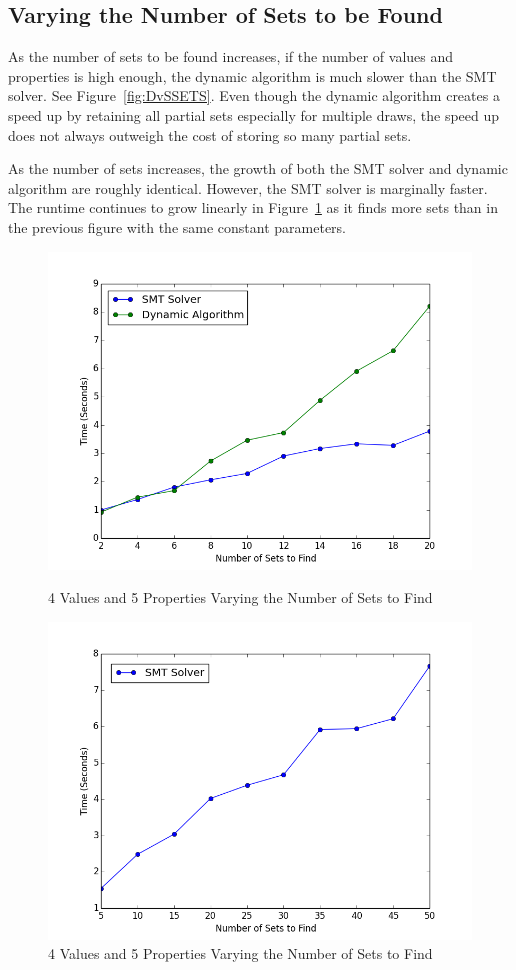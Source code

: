 \documentclass[pageno]{jpaper}
\begin{document}
\subsection{Varying the Number of Sets to be Found}

As the number of sets to be found increases, if the number of values and properties is high enough, the dynamic algorithm is much slower than  the SMT solver. See Figure~\ref{fig:DvSSETS}. Even though the dynamic algorithm creates a speed up by retaining all partial sets especially for multiple draws, the speed up does not always outweigh the cost of storing so many partial sets.

As the number of sets increases, the growth of both the SMT solver and dynamic algorithm are roughly identical. However, the SMT solver is marginally faster. The runtime continues to grow linearly in Figure~\ref{fig:SMTSet} as it finds more sets than in the previous figure with the same constant parameters.


\begin{figure}[htbb]
\begin{minipage}[b]{0.5\linewidth}
\centering
\includegraphics[width=.75\linewidth]{DvSSETS-v4p5n2468101214161820.png}
\caption{4 Values and 5 Properties Varying the Number of Sets to Find}
\label{fig:DvSSETS}
\end{minipage}
\hspace{0.5cm}
\begin{minipage}[b]{0.5\linewidth}
\centering
\includegraphics[width=.75\linewidth]{SMTOnlySETS-v4p5n5101520253035404550.png}
\caption{4 Values and 5 Properties Varying the Number of Sets to Find}
\label{fig:SMTSet}
\end{minipage}
\end{figure}
\end{document}
